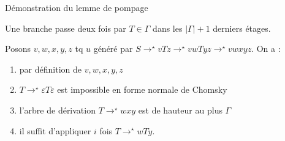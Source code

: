 \begin{frame}{Démonstration du lemme de pompage}
{    Une branche passe deux fois par $T \in \Gamma$ dans les $|\Gamma| + 1$ derniers étages.

    \alert{Posons $v, w, x, y, z$} tq $u$ généré par $S \rightarrow^\star v T z \rightarrow^\star v w T y z \rightarrow^\star v w x y z$. On a :

    \vspace{1mm}
    \begin{enumerate}
    \item {} par définition de $v, w, x, y, z$
    \item {} $T \rightarrow^\star \varepsilon T \varepsilon$ est impossible en forme normale de Chomsky
    \item {} l'arbre de dérivation $T \rightarrow^\star w x y$ est de hauteur au plus $\Gamma$
    \item {} il suffit d'appliquer $i$ fois $T \rightarrow^\star w T y$.
    \end{enumerate}
  }
  
\end{frame}

\endgroup
\endinput
